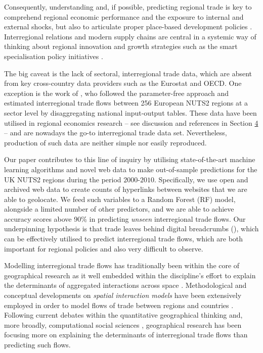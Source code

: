 \documentclass[sigconf]{acmart}
\begin{document}
Consequently, understanding and, if possible, predicting regional trade
is key to comprehend regional economic performance and the exposure to
internal and external shocks, but also to articulate proper place-based
development policies \citep{barca2009agenda}. Interregional relations
and modern supply chains are central in a systemic way of thinking about
regional innovation and growth strategies \citep{thissen2013integrated}
such as the smart specialisation policy initiatives
\citep{mccann2015smart}.

The big caveat is the lack of sectoral, interregional trade data, which
are absent from key cross-country data providers such as the Eurostat
and OECD. One exception is the work of \citet{thissen2013integrated},
who followed the parameter-free \citet{simini2012universal} approach and
estimated interregional trade flows between 256 European NUTS2 regions
at a sector level by disaggregating national input-output tables. These
data have been utilised in regional economics research -- see discussion
and references in Section \protect\hyperlink{sec:4}{4} -- and are
nowadays the go-to interregional trade data set. Nevertheless,
production of such data are neither simple nor easily reproduced.

Our paper contributes to this line of inquiry by utilising
state-of-the-art machine learning algorithms and novel web data to make
out-of-sample predictions for the UK NUTS2 regions during the period
\(2000\)-\(2010\). Specifically, we use open and archived web data to
create counts of hyperlinks between websites that we are able to
geolocate. We feed such variables to a Random Forest (RF) model,
alongside a limited number of other predictors, and we are able to
achieve accuracy scores above 90\% in predicting \emph{unseen}
interregional trade flows. Our underpinning hypothesis is that trade
leaves behind digital breadcrumbs (\citet{rabari_storper2014}), which
can be effectively utilised to predict interregional trade flows, which
are both important for regional policies and also very difficult to
observe.

Modelling interregional trade flows has traditionally been within the
core of geographical research as it well embedded within the
discipline's effort to explain the determinants of aggregated
interactions across space \citep[for a recent review
see][]{oshan2020spatial}. Methodological and conceptual developments on
\emph{spatial interaction models} have been extensively employed in
order to model flows of trade between regions
\citep[\citet{paul2008incorporating}]{chun2012modeling} and countries
\citep{de2017testing, de2017competing}. Following current debates within
the quantitative geographical thinking \citep{singleton2021geographic}
and, more broadly, computational social sciences
\citep{lazer2009social}, geographical research has been focusing more on
explaining the determinants of interregional trade flows than predicting
such flows.
\end{document}
